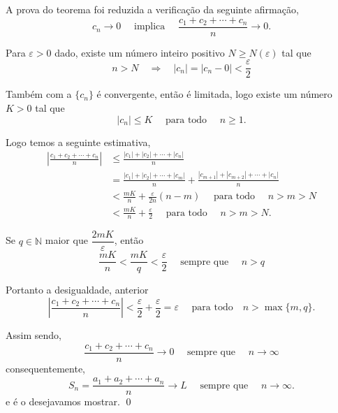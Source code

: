 A prova do teorema foi reduzida a verifica\c{c}\~{a}o da seguinte afirma\c{c}\~{a}o,
\begin{equation*}
    c_n\to 0\quad \text{ implica }\quad \frac{c_1+c_2+\cdots+c_n}{n}\to 0.
\end{equation*}

Para $\varepsilon>0$ dado, existe um n\'{u}mero inteiro positivo $N \geq N(\varepsilon)$ tal que
\begin{equation*}
n>N \quad \Rightarrow \quad  |c_n|=|c_n-0|<\dfrac{\varepsilon}{2}
\end{equation*}

Tamb\'{e}m com a \seq $\{c_n\}$ \'{e} convergente, ent\~{a}o \'{e} limitada, logo 
existe um n\'{u}mero $K>0$ tal que
\begin{equation*}
    |c_n|\leq K\quad \text{ para todo }\quad n\geq 1.
\end{equation*}

Logo temos a seguinte estimativa,
\begin{align*}
  \left|\frac{c_1+c_2+\cdots+c_n}{n}\right|&\leq \frac{|c_1|+|c_2|+\cdots+|c_n|}{n}\\[2ex]
&=\frac{|c_1|+|c_2|+\cdots+|c_m|}{n}+\frac{|c_{m+1}|+|c_{m+2}|+\cdots+|c_n|}{n}\\[2ex]
&<\frac{mK}{n}+\frac{\varepsilon}{2n}(n-m)\quad \text{ para todo }\quad n>m>N \\[2ex]
&<\frac{mK}{n}+\frac{\varepsilon}{2}\quad \text{ para todo }\quad n>m>N.
\end{align*}

Se $q\in \mathbb{N}$ maior que $\dfrac{2mK}{\varepsilon}$, ent\~{a}o
\begin{equation*}
    \frac{mK}{n}<\frac{mK}{q}<\frac{\varepsilon}{2}\quad \text{ sempre que }\quad n>q
\end{equation*}

Portanto a desigualdade, anterior
\begin{equation*}
  \left|\frac{c_1+c_2+\cdots+c_n}{n}\right|<\frac{\varepsilon}{2}+\frac{\varepsilon}{2}=
  \varepsilon \quad \text{ para todo} \quad n>\max\{m, q \}.
\end{equation*}

Assim sendo,
\begin{equation*}
\frac{c_1+c_2+\cdots+c_n}{n}\to 0\quad \text{ sempre que }\quad n\to \infty
\end{equation*}
consequentemente,
\begin{equation*}
    S_n=\frac{a_1+a_2+\cdots+a_n}{n}\to L \quad \text{ sempre que }\quad n\to \infty.
\end{equation*}
e \'{e} o desejavamos mostrar. \qed



